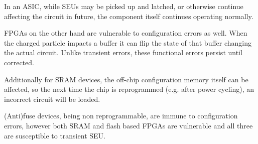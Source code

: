 \documentclass[12pt,final,oneside]{memoir} %
\begin{document}
%    
In an \ac{ASIC}, while \acp{SEU} may be picked up and latched, or otherwise continue affecting the circuit in future, the component itself continues operating normally.

\acp{FPGA} on the other hand are vulnerable to configuration errors as well. When the charged particle impacts a buffer it can flip the state of that buffer changing the actual circuit. Unlike transient errors, these functional errors persist until corrected.

Additionally for \ac{SRAM} devices, the off-chip configuration memory itself can be affected, so the next time the chip is reprogrammed (e.g. after power cycling), an incorrect circuit will be loaded.

(Anti)fuse devices, being non reprogrammable, are immune to configuration errors, however both \ac{SRAM} and flash based \acp{FPGA} are vulnerable and all three are susceptible to transient \ac{SEU}\cite{HFPP}.
\end{document}
